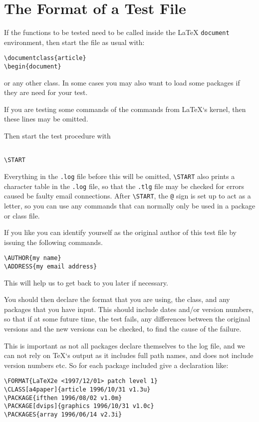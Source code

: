 \documentclass{ltugboat}
\begin{document}
\section{The Format of a Test File}

If the functions to be tested need to be called inside the \LaTeX{}
\texttt{document} environment, then start the file as usual with:
\begin{verbatim}
\documentclass{article}
\begin{document}
\end{verbatim}
or any other class. In some cases you may also want to load some
packages if they are need for your test.

If you are testing some commands of the commands from \LaTeX`s kernel,
then these lines may be omitted.

Then start the test procedure with
\begin{verbatim}

\START
\end{verbatim}
Everything in the \texttt{.log} file before this will be omitted,
\verb|\START| also prints a character table in the \texttt{.log} file,
so that the \texttt{.tlg} file may be checked for errors caused be
faulty email connections.  After \verb|\START|, the \texttt{@} sign is
set up to act as a letter, so you can use any commands that can
normally only be used in a package or class file.

If you like you can identify yourself as the original author of this
test file by issuing the following commands.
\begin{verbatim}
\AUTHOR{my name}
\ADDRESS{my email address}
\end{verbatim}
This will help us to get back to you later if necessary.


You should then declare the format that you are using, the class, and
any packages that you have input. This should include dates and/or
version numbers, so that if at some future time, the test fails, any
differences between the original versions and the new versions can be
checked, to find the cause of the failure.

This is important as
not all packages declare themselves to the log file, and we can not
rely on TeX`s output as it includes full path names, and does not
include version numbers etc.  So for each package included give a
declaration like:
\begin{verbatim}
\FORMAT{LaTeX2e <1997/12/01> patch level 1}
\CLASS[a4paper]{article 1996/10/31 v1.3u}
\PACKAGE{ifthen 1996/08/02 v1.0m}
\PACKAGE[dvips]{graphics 1996/10/31 v1.0c}
\PACKAGES{array 1996/06/14 v2.3i}
\end{verbatim}
\end{document}
